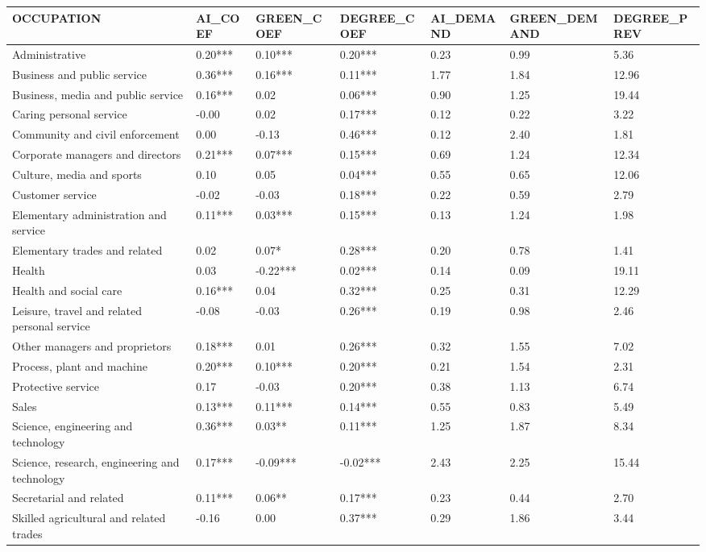 \begin{tabular}{lllllll}
\toprule
OCCUPATION & AI_COEF & GREEN_COEF & DEGREE_COEF & AI_DEMAND & GREEN_DEMAND & DEGREE_PREV \\
\midrule
Administrative & 0.20*** & 0.10*** & 0.20*** & 0.23 & 0.99 & 5.36 \\
Business and public service & 0.36*** & 0.16*** & 0.11*** & 1.77 & 1.84 & 12.96 \\
Business, media and public service & 0.16*** & 0.02 & 0.06*** & 0.90 & 1.25 & 19.44 \\
Caring personal service & -0.00 & 0.02 & 0.17*** & 0.12 & 0.22 & 3.22 \\
Community and civil enforcement & 0.00 & -0.13 & 0.46*** & 0.12 & 2.40 & 1.81 \\
Corporate managers and directors & 0.21*** & 0.07*** & 0.15*** & 0.69 & 1.24 & 12.34 \\
Culture, media and sports & 0.10 & 0.05 & 0.04*** & 0.55 & 0.65 & 12.06 \\
Customer service & -0.02 & -0.03 & 0.18*** & 0.22 & 0.59 & 2.79 \\
Elementary administration and service & 0.11*** & 0.03*** & 0.15*** & 0.13 & 1.24 & 1.98 \\
Elementary trades and related & 0.02 & 0.07* & 0.28*** & 0.20 & 0.78 & 1.41 \\
Health & 0.03 & -0.22*** & 0.02*** & 0.14 & 0.09 & 19.11 \\
Health and social care & 0.16*** & 0.04 & 0.32*** & 0.25 & 0.31 & 12.29 \\
Leisure, travel and related personal service & -0.08 & -0.03 & 0.26*** & 0.19 & 0.98 & 2.46 \\
Other managers and proprietors & 0.18*** & 0.01 & 0.26*** & 0.32 & 1.55 & 7.02 \\
Process, plant and machine & 0.20*** & 0.10*** & 0.20*** & 0.21 & 1.54 & 2.31 \\
Protective service & 0.17 & -0.03 & 0.20*** & 0.38 & 1.13 & 6.74 \\
Sales & 0.13*** & 0.11*** & 0.14*** & 0.55 & 0.83 & 5.49 \\
Science, engineering and technology & 0.36*** & 0.03** & 0.11*** & 1.25 & 1.87 & 8.34 \\
Science, research, engineering and technology & 0.17*** & -0.09*** & -0.02*** & 2.43 & 2.25 & 15.44 \\
Secretarial and related & 0.11*** & 0.06** & 0.17*** & 0.23 & 0.44 & 2.70 \\
Skilled agricultural and related trades & -0.16 & 0.00 & 0.37*** & 0.29 & 1.86 & 3.44 \\

\end{tabular}
